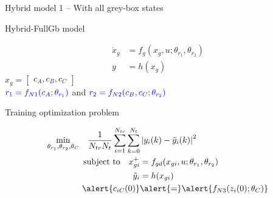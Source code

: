 \documentclass[xcolor=dvipsnames, 8pt]{beamer} %
\begin{document}
\begin{frame}{Hybrid model 1 -- With all grey-box states}

\begin{block}{Hybrid-FullGb model}

	\begin{align*}
		\dot{x}_{g} &= f_g(x_g, u;\theta_{r_1}, \theta_{r_2}) \\ 
		y &= h(x_g)
	\end{align*}
	$x_g = \begin{bmatrix} c_A, c_B, c_C\end{bmatrix}$ \\
	$\textcolor{blue}{r_1 = f_{N1}(c_A;\theta_{r_1})}$ and 
	$\textcolor{blue}{r_2 = f_{N2}(c_B, c_C;\theta_{r_2})}$
\end{block}

\pause
\begin{block}{Training optimization problem}
	
	\begin{align*}
		\underset{\theta_{r_1}, 
				  \theta_{r_2}, \theta_{C}}{\textnormal{min}} \quad 
		\dfrac{1}{N_{tr} 
			N_t} \sum_{i=1}^{N_{tr}}
		\sum_{k=0}^{N_t} & \norm{y_i(k) - \tilde{y}_i(k)}^2 \\ 
		\textnormal{subject to} \quad x_{gi}^+ & = f_{gd}(x_{gi}, 
		u;\theta_{r_1}, 
		\theta_{r_2}) \\
		\tilde{y}_i &= h(x_{gi}) \\ 
		\alert{c_{iC}(0)} & \alert{=} \alert{f_{N3}(z_i(0); \theta_C)}\\ 
	\end{align*}
\end{block}

\end{frame}
\end{document}
